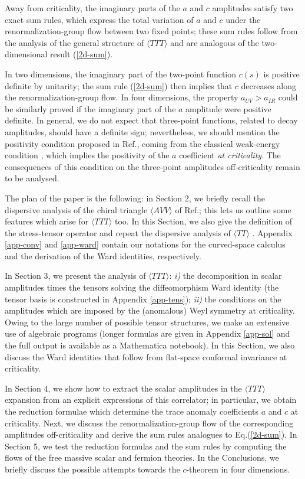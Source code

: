 \documentclass[11pt]{article}
\def\TTT{\bra TTT\ket}
\def\bra{\langle}
\def\ket{\rangle}
\begin{document}
Away from criticality, the imaginary parts of the $a$ and $c$
amplitudes satisfy two exact sum rules, which express the total 
variation of $a$ and $c$ under the renormalization-group flow 
between two fixed points; these sum rules follow from the analysis
of the general structure of $\TTT$ 
and are analogous of the two-dimensional result (\ref{2d-sum}).

In two dimensions, the imaginary part of
the two-point function $c(s)$ is positive definite
by unitarity; the sum rule (\ref{2d-sum}) then
implies that $c$ decreases along the renormalization-group flow.
In four dimensions, the property $a_{UV} > a_{IR}$ could be
similarly proved if the imaginary part of the $a$ amplitude
were positive definite.
In general, we do not expect that three-point functions,
related to decay amplitudes, should have a definite sign;
nevertheless, we should mention the positivity condition proposed in 
Ref.\cite{ol}, coming from the classical weak-energy 
condition \cite{bd}, which implies the positivity of the $a$ 
coefficient {\it at criticality}.
The consequences of this condition on the
three-point amplitudes off-criticality remain to be analysed.


The plan of the paper is the following: in Section 2, we briefly 
recall the dispersive analysis of the chiral triangle 
$\bra AVV \ket$ of Ref.\cite{fsby}; this lets us
outline some features which arise for $\bra TTT\ket$ too. 
In this Section, we also give the definition
of the stress-tensor operator and repeat
the dispersive analysis of $\bra TT \ket$ \cite{cfl}\cite{clv}\cite{hore}.
Appendix \ref{app-conv} and \ref{app-ward} contain our notations
for the curved-space calculus and the derivation of the 
Ward identities, respectively. 

In Section 3, we present the analysis of $\bra TTT \ket$: 
{\it i)} the decomposition in scalar amplitudes times the tensors
 solving the diffeomorphism Ward identity
(the tensor basis is constructed in Appendix \ref{app-tens}); 
{\it ii)} the conditions on the amplitudes 
which are imposed by the (anomalous) Weyl symmetry at criticality.
Owing to the large number of possible tensor structures,
we make an extensive use of algebraic programs
(longer formulas are given in Appendix \ref{app-sol} and the full output
is available as a Mathematica \cite{wolf} notebook). 
In this Section, we also discuss the Ward identities that
follow from flat-space conformal invariance at criticality.

In Section 4, we show how to extract the scalar amplitudes in
the $\TTT$ expansion from an explicit expressions of this correlator;
in particular, we obtain the reduction formulae which determine
the trace anomaly coefficients $a$ and $c$ at criticality. 
Next, we discuss the renormalization-group flow of the corresponding
amplitudes off-criticality and derive the sum rules analogues to
Eq.(\ref{2d-sum}).
In Section 5, we test the reduction formulas and the sum rules
by computing the flows of the free massive scalar and fermion theories.
In the Conclusions, we briefly discuss the possible
attempts towards the $c$-theorem in four dimensions.
 
\end{document}

